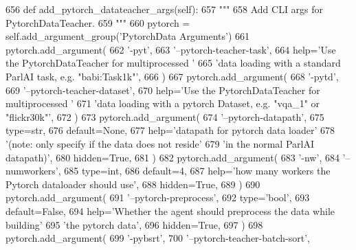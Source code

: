 \begin{DoxyCode}
656     \textcolor{keyword}{def }add\_pytorch\_datateacher\_args(self):
657         \textcolor{stringliteral}{"""}
658 \textcolor{stringliteral}{        Add CLI args for PytorchDataTeacher.}
659 \textcolor{stringliteral}{        """}
660         pytorch = self.add\_argument\_group(\textcolor{stringliteral}{'PytorchData Arguments'})
661         pytorch.add\_argument(
662             \textcolor{stringliteral}{'-pyt'},
663             \textcolor{stringliteral}{'--pytorch-teacher-task'},
664             help=\textcolor{stringliteral}{'Use the PytorchDataTeacher for multiprocessed '}
665             \textcolor{stringliteral}{'data loading with a standard ParlAI task, e.g. "babi:Task1k"'},
666         )
667         pytorch.add\_argument(
668             \textcolor{stringliteral}{'-pytd'},
669             \textcolor{stringliteral}{'--pytorch-teacher-dataset'},
670             help=\textcolor{stringliteral}{'Use the PytorchDataTeacher for multiprocessed '}
671             \textcolor{stringliteral}{'data loading with a pytorch Dataset, e.g. "vqa\_1" or "flickr30k"'},
672         )
673         pytorch.add\_argument(
674             \textcolor{stringliteral}{'--pytorch-datapath'},
675             type=str,
676             default=\textcolor{keywordtype}{None},
677             help=\textcolor{stringliteral}{'datapath for pytorch data loader'}
678             \textcolor{stringliteral}{'(note: only specify if the data does not reside'}
679             \textcolor{stringliteral}{'in the normal ParlAI datapath)'},
680             hidden=\textcolor{keyword}{True},
681         )
682         pytorch.add\_argument(
683             \textcolor{stringliteral}{'-nw'},
684             \textcolor{stringliteral}{'--numworkers'},
685             type=int,
686             default=4,
687             help=\textcolor{stringliteral}{'how many workers the Pytorch dataloader should use'},
688             hidden=\textcolor{keyword}{True},
689         )
690         pytorch.add\_argument(
691             \textcolor{stringliteral}{'--pytorch-preprocess'},
692             type=\textcolor{stringliteral}{'bool'},
693             default=\textcolor{keyword}{False},
694             help=\textcolor{stringliteral}{'Whether the agent should preprocess the data while building'}
695             \textcolor{stringliteral}{'the pytorch data'},
696             hidden=\textcolor{keyword}{True},
697         )
698         pytorch.add\_argument(
699             \textcolor{stringliteral}{'-pybsrt'},
700             \textcolor{stringliteral}{'--pytorch-teacher-batch-sort'},

\end{DoxyCode}
